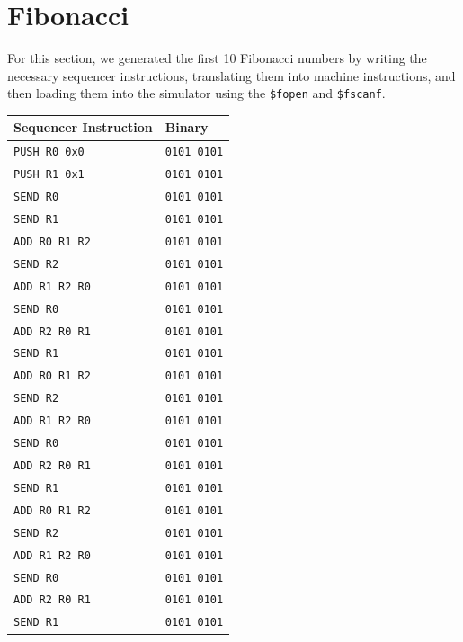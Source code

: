 \documentclass[]{article}
\begin{document}
\section{Fibonacci}

For this section, we generated the first 10 Fibonacci numbers by writing the necessary sequencer instructions, translating them into machine instructions, and then loading them into the simulator using the \texttt{\$fopen} and \texttt{\$fscanf}.


\begin{table}[H]
\centering
\begin{tabular}{ l | l }
\textbf{Sequencer Instruction} & \textbf{Binary}\\\hline
\texttt{PUSH R0 0x0} & \texttt{0101 0101}\\
\texttt{PUSH R1 0x1} & \texttt{0101 0101}\\
\texttt{SEND R0} & \texttt{0101 0101}\\
\texttt{SEND R1} & \texttt{0101 0101}\\
\texttt{ADD R0 R1 R2} & \texttt{0101 0101}\\
\texttt{SEND R2} & \texttt{0101 0101}\\
\texttt{ADD R1 R2 R0} & \texttt{0101 0101}\\
\texttt{SEND R0} & \texttt{0101 0101}\\
\texttt{ADD R2 R0 R1} & \texttt{0101 0101}\\
\texttt{SEND R1} & \texttt{0101 0101}\\
\texttt{ADD R0 R1 R2} & \texttt{0101 0101}\\
\texttt{SEND R2} & \texttt{0101 0101}\\
\texttt{ADD R1 R2 R0} & \texttt{0101 0101}\\
\texttt{SEND R0} & \texttt{0101 0101}\\
\texttt{ADD R2 R0 R1} & \texttt{0101 0101}\\
\texttt{SEND R1} & \texttt{0101 0101}\\
\texttt{ADD R0 R1 R2} & \texttt{0101 0101}\\
\texttt{SEND R2} & \texttt{0101 0101}\\
\texttt{ADD R1 R2 R0} & \texttt{0101 0101}\\
\texttt{SEND R0} & \texttt{0101 0101}\\
\texttt{ADD R2 R0 R1} & \texttt{0101 0101}\\
\texttt{SEND R1} & \texttt{0101 0101}\\

\end{tabular}
\end{table}
\end{document}
